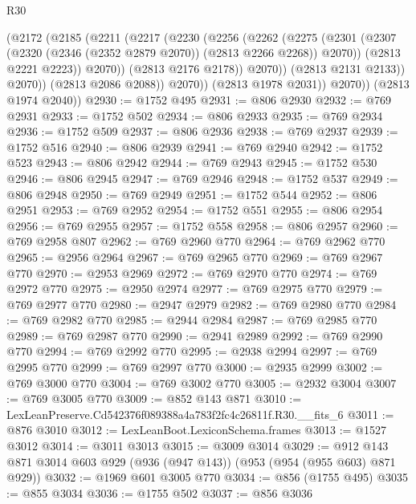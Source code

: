 \begin{lexlean}{R30}
\begin{coremodule}
                    (@2172
                      (@2185
                        (@2211
                          (@2217
                            (@2230
                              (@2256
                                (@2262
                                  (@2275
                                    (@2301
                                      (@2307
                                        (@2320 (@2346 (@2352 @2879 @2070)) (@2813 @2266 @2268))
                                        @2070))
                                    (@2813 @2221 @2223))
                                  @2070))
                              (@2813 @2176 @2178))
                            @2070))
                        (@2813 @2131 @2133))
                      @2070))
                  (@2813 @2086 @2088))
                @2070))
            (@2813 @1978 @2031))
          @2070))
      (@2813 @1974 @2040))
@2930 := @1752 @495
@2931 := @806 @2930
@2932 := @769 @2931
@2933 := @1752 @502
@2934 := @806 @2933
@2935 := @769 @2934
@2936 := @1752 @509
@2937 := @806 @2936
@2938 := @769 @2937
@2939 := @1752 @516
@2940 := @806 @2939
@2941 := @769 @2940
@2942 := @1752 @523
@2943 := @806 @2942
@2944 := @769 @2943
@2945 := @1752 @530
@2946 := @806 @2945
@2947 := @769 @2946
@2948 := @1752 @537
@2949 := @806 @2948
@2950 := @769 @2949
@2951 := @1752 @544
@2952 := @806 @2951
@2953 := @769 @2952
@2954 := @1752 @551
@2955 := @806 @2954
@2956 := @769 @2955
@2957 := @1752 @558
@2958 := @806 @2957
@2960 := @769 @2958 @807
@2962 := @769 @2960 @770
@2964 := @769 @2962 @770
@2965 := @2956 @2964
@2967 := @769 @2965 @770
@2969 := @769 @2967 @770
@2970 := @2953 @2969
@2972 := @769 @2970 @770
@2974 := @769 @2972 @770
@2975 := @2950 @2974
@2977 := @769 @2975 @770
@2979 := @769 @2977 @770
@2980 := @2947 @2979
@2982 := @769 @2980 @770
@2984 := @769 @2982 @770
@2985 := @2944 @2984
@2987 := @769 @2985 @770
@2989 := @769 @2987 @770
@2990 := @2941 @2989
@2992 := @769 @2990 @770
@2994 := @769 @2992 @770
@2995 := @2938 @2994
@2997 := @769 @2995 @770
@2999 := @769 @2997 @770
@3000 := @2935 @2999
@3002 := @769 @3000 @770
@3004 := @769 @3002 @770
@3005 := @2932 @3004
@3007 := @769 @3005 @770
@3009 := @852 @143 @871
@3010 := LexLeanPreserve.Cd542376f089388a4a783f2fc4c26811f.R30.__fits_6
@3011 := @876 @3010
@3012 := LexLeanBoot.LexiconSchema.frames
@3013 := @1527 @3012
@3014 := @3011 @3013
@3015 := @3009 @3014
@3029 := @912 @143 @871 @3014 @603 @929 (@936 (@947 @143)) (@953 (@954 (@955 @603) @871 @929))
@3032 := @1969 @601 @3005 @770
@3034 := @856 (@1755 @495)
@3035 := @855 @3034
@3036 := @1755 @502
@3037 := @856 @3036

\end{coremodule}
\end{lexlean}
